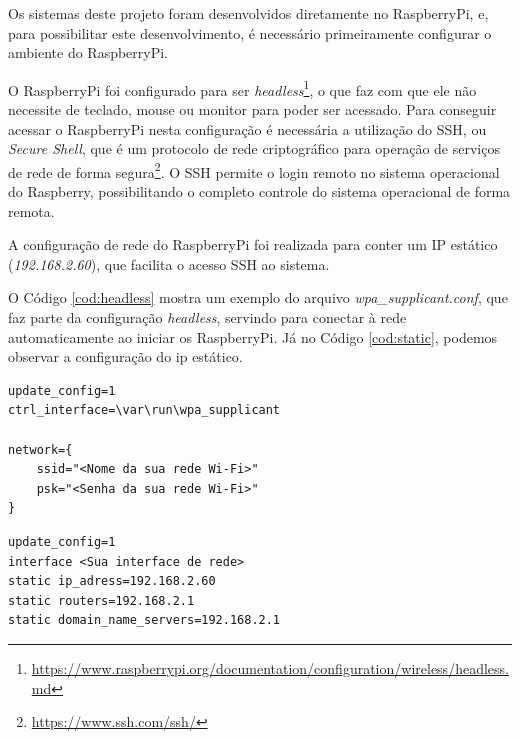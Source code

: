 Os sistemas deste projeto foram desenvolvidos diretamente no RaspberryPi, e, para possibilitar este desenvolvimento, é necessário primeiramente configurar o ambiente do RaspberryPi.

O RaspberryPi foi configurado para ser \textit{headless}\footnote{\url{https://www.raspberrypi.org/documentation/configuration/wireless/headless.md}}, o que faz com que ele não necessite de teclado, mouse ou monitor para poder ser acessado. Para conseguir acessar o RaspberryPi nesta configuração é necessária a utilização do SSH, ou \textit{Secure Shell}, que é um protocolo de rede criptográfico para operação de serviços de rede de forma segura\footnote{\url{https://www.ssh.com/ssh/}}. O SSH permite o login remoto no sistema operacional do Raspberry, possibilitando o completo controle do sistema operacional de forma remota.

A configuração de rede do RaspberryPi foi realizada para conter um IP estático (\textit{192.168.2.60}), que facilita o acesso SSH ao sistema.

O Código \ref{cod:headless} mostra um exemplo do arquivo \textit{wpa\_supplicant.conf}, que faz parte da configuração \textit{headless}, servindo para conectar à rede automaticamente ao iniciar os RaspberryPi. Já no Código \ref{cod:static}, podemos observar a configuração do ip estático.

\begin{lstlisting}[caption=Exemplo de configuração \textit{headless}, label=cod:headless]
update_config=1
ctrl_interface=\var\run\wpa_supplicant

network={
    ssid="<Nome da sua rede Wi-Fi>"
    psk="<Senha da sua rede Wi-Fi>"
}
\end{lstlisting}

\begin{lstlisting}[caption=Exemplo de configuração do IP estático, label=cod:static]
update_config=1
interface <Sua interface de rede>
static ip_adress=192.168.2.60
static routers=192.168.2.1
static domain_name_servers=192.168.2.1
\end{lstlisting}



